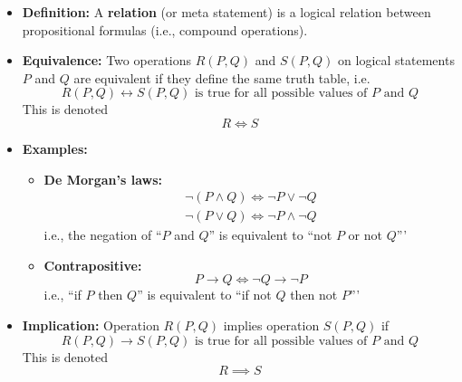 \documentclass[11pt,twoside]{report}
\begin{document}
   \begin{itemize}
\item  \textbf{Definition:}  A \textbf{relation} (or meta statement) is a logical relation between propositional formulas (i.e., compound operations). %




\item \textbf{Equivalence:}  
Two operations $R(P, Q)$ and $S(P, Q)$ on logical statements $P$ and $Q$ are equivalent
  if they define the same truth table, i.e. 
\[
 \text{$R(P, Q) \leftrightarrow  S(P, Q)$  is true for all possible values of $P$ and $Q$}
\]
This is denoted
\[
R \iff S %
\]

\item \textbf{Examples:}
\begin{itemize}
\item  \textbf{De Morgan's laws: }
\begin{align*}
\neg  (P \wedge Q) \iff \neg P \vee \neg Q\\
\neg  (P \vee Q) \iff \neg P \wedge \neg Q
\end{align*}
i.e., the negation of ``$P$ and $Q$'' is equivalent to ``not $P$ or not $Q$'''

\item \textbf{Contrapositive:}
\[
P \to Q \iff  \neg Q \to\neg P 
\]
i.e., ``if $P$ then $Q$''  is equivalent to ``if not $Q$ then  not $P$'''
\end{itemize}


\item \textbf{Implication:} Operation  $R(P, Q)$  implies operation $S(P, Q)$ if
\[
 \text{$R(P, Q) \to S(P, Q)$ is true for all possible values of $P$ and $Q$}
\]
This is denoted 
\[
R \implies  S %
\]



\end{itemize}
\end{document}
